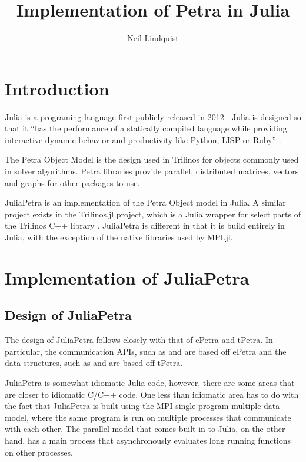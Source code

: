 \documentclass[acmsmall]{acmart}
\title{Implementation of Petra in Julia}
\author{Neil Lindquist}
\newcommand{\juliaSnippet}[1]{\texttt{\detokenize{#1}}}
\begin{document}
\maketitle

\section{Introduction}

Julia is a programing language first publicly released in 2012 \cite{WhyWeCreatedJulia}.
Julia is designed so that it
``has the performance of a statically compiled
language while providing interactive dynamic behavior and productivity like Python, LISP or
Ruby'' \cite{JuliaDesignPaper}.

The Petra Object Model is the design used in Trilinos for objects commonly used in solver algorithms.
\cite{OverviewOfTrilinos}
Petra libraries provide parallel, distributed matrices, vectors and graphs for other packages to use.

JuliaPetra is an implementation of the Petra Object model in Julia.
A similar project exists in the Trilinos.jl project, which is a Julia wrapper for select parts of
the Trilinos C++ library \cite{Trilinos.jlGithub}.
JuliaPetra is different in that it is build entirely in Julia, with the exception of the
native libraries used by MPI.jl.


\section{Implementation of JuliaPetra}

\subsection{Design of JuliaPetra}

The design of JuliaPetra follows closely with that of ePetra and tPetra.
In particular, the communication APIs, such as \juliaSnippet{Comm} and \juliaSnippet{BlockMap}
are based off ePetra and the data structures, such as \juliaSnippet{MultiVector} and
\juliaSnippet{RowMatrix} are based off tPetra.


JuliaPetra is somewhat idiomatic Julia code, however, there are some areas that are closer to
idiomatic C/C++ code.
One less than idiomatic area has to do with the fact that JuliaPetra is built using the MPI
single-program-multiple-data model, where the same program is run on multiple processes
that communicate with each other.
The parallel model that comes built-in to Julia, on the other hand, has a main process that
asynchronously evaluates long running functions on other processes.  \cite{JuliaFreshApproach}
\end{document}
